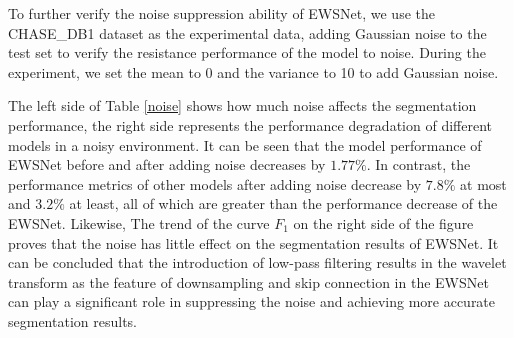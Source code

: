 \documentclass[a4paper,fleqn]{cas-dc}
\begin{document}
\begin{table}[H]
	\centering
	\caption{The impact of the wavelet transform sampling module on the segmentation performance of EWSNet. $case$ 1 signifies the utilization of wavelet transformation, $case$ 2 denotes the omission of the skip connection module, while $case$ 3 refers to the exclusion of the wavelet transform module.}
	\label{wavehyper}
\end{table}

To further verify the noise suppression ability of EWSNet, we use the CHASE\_DB1 dataset as the experimental data, adding Gaussian noise to the test set to verify the resistance performance of the model to noise.  During the experiment, we set the mean to 0 and the variance to 10 to add Gaussian noise. 


The left side of Table \ref{noise} shows how much noise affects the segmentation performance, the right side represents the performance degradation of different models in a noisy environment. It can be seen that the model performance of EWSNet before and after adding noise decreases by $1.77\%$. In contrast, the performance metrics of other models after adding noise decrease by $7.8\%$ at most and $3.2\%$ at least, all of which are greater than the performance decrease of the EWSNet. Likewise, The trend of the curve $F_{1}$ on the right side of the figure proves that the noise has little effect on the segmentation results of EWSNet. It can be concluded that the introduction of low-pass filtering results in the wavelet transform as the feature of downsampling and skip connection in the EWSNet can play a significant role in suppressing the noise and achieving more accurate segmentation results.
\end{document}
